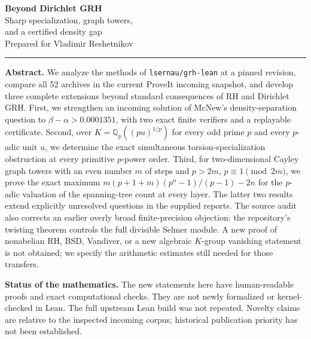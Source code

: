 \documentclass[11pt,letterpaper]{article}
\theoremstyle{remark}\newtheorem{remark}[theorem]{Remark}
\newcommand{\Q}{\mathbb Q}\newcommand{\N}{\mathbb N}
\begin{document}
\thispagestyle{plain}
\vspace{0.55cm}
\begin{flushleft}
{\Huge\bfseries Beyond Dirichlet GRH}\\[0.22cm]
{\Large Sharp specialization, graph towers,\\[2pt]
and a certified density gap}\\[0.25cm]
{Prepared for Vladimir Reshetnikov}
\end{flushleft}
\vspace{0.1cm}\hrule\vspace{0.25cm}
\noindent\textbf{Abstract.}
We analyze the methods of \texttt{lsernau/grh-lean} at a pinned revision,
compare all 52 archives in the current ProveIt incoming snapshot, and develop
three complete extensions beyond standard consequences of RH and Dirichlet GRH.
First, we strengthen an incoming solution of McNew's density-separation question to
$\beta-\alpha>0.0001351$, with two exact finite verifiers and a replayable certificate.
Second, over $K=\Q_p((pu)^{1/p})$ for every odd prime $p$ and every $p$-adic unit $u$,
we determine the exact simultaneous torsion-specialization obstruction at every
primitive $p$-power order. Third, for two-dimensional Cayley graph towers with an
even number $m$ of steps and $p>2m$, $p\equiv1\pmod{2m}$, we prove the exact maximum
$m(p+1+m)(p^n-1)/(p-1)-2n$ for the $p$-adic valuation of the spanning-tree count
at every layer. The latter two results extend explicitly unresolved questions in
the supplied reports. The source audit also corrects an earlier overly broad
finite-precision objection: the repository's twisting theorem controls the full
divisible Selmer module. A new proof of nonabelian RH, BSD, Vandiver, or a new
algebraic $K$-group vanishing statement is not obtained; we specify the arithmetic
estimates still needed for those transfers.

\vspace{0.15cm}
\noindent\textbf{Status of the mathematics.}
The new statements here have human-readable proofs and exact computational checks.
They are not newly formalized or kernel-checked in Lean. The full upstream Lean
build was not repeated. Novelty claims are relative to the inspected incoming
corpus; historical publication priority has not been established.
\clearpage
\tableofcontents
\clearpage



\clearpage




\begingroup\small

\endgroup
\end{document}

